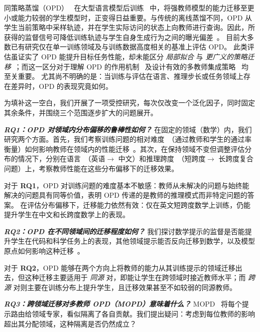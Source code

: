 同策略蒸馏（OPD）~\citep{agarwal2024policy} 在大型语言模型后训练~\cite{coreteam2026mimov2flashtechnicalreport,kimiteam2026kimik3openfrontier,glm5team2026glm5vibecodingagentic} 中，将强教师模型的能力迁移至更小或能力较弱的学生模型时，正变得日益重要。与传统的离线蒸馏不同，OPD 从学生当前策略中采样轨迹，并在学生实际访问的状态上向教师进行查询。因此，所获得的监督信号可降低训练轨迹与学生自身生成行为之间的曝光偏差~\citep{lu2025onpolicydistillation}。  
目前大多数已有研究仅在单一训练领域及与训练数据高度相关的基准上评估 OPD。  
此类评估虽证实了 OPD 能提升目标任务性能，却未能区分 \emph{局部拟合} 与 \emph{更广义的策略迁移}~\citep{chu2025sft}；而这一区分对于理解 OPD 的作用机制~\citep{li2026rethinking} 及设计有效的多教师集成策略~\citep{ma2026mopd} 均至关重要。  
尤其尚不明确的是：当训练与评估在语言、推理步长或任务领域上存在差异时，OPD 的表现究竟如何。

为填补这一空白，我们开展了一项受控研究，每次仅改变一个泛化因子，同时固定其余条件，并围绕三个范围逐步扩大的问题展开。

\textbf{\emph{RQ1：OPD 对领域内分布偏移的鲁棒性如何？}}  
在固定的领域（数学）内，我们研究两个方面。首先，我们考察训练问题的相对难度~\citep{chandra2025shape,yu2026dapo,zheng2026scope}（通过教师和学生的通过率衡量）如何影响教师在领域内的性能迁移~\citep{zheng2026scope,hou2026uni}。其次，在保持领域不变但调整评估分布的情况下，分别在语言~\citep{liu2025livemathbench,sun2026olymmath}（英语$\rightarrow$ 中文）和推理跨度~\citep{lu2025r,shojaee2025the}（短跨度$\rightarrow$ 长跨度复合问题）上，考察教师性能在这些分布偏移下的迁移效果。

对于 \textbf{RQ1}，OPD 对训练问题的难度基本不敏感：教师从未解决的问题与始终能解决的问题具有同等价值，表明 OPD 传递的是教师的推理模式而非特定问题的答案。  
在评估分布偏移下，迁移能力依然有效：仅在英文短跨度数学上训练，仍能提升学生在中文和长跨度数学上的表现。

\textbf{\emph{RQ2：OPD 在不同领域间的迁移程度如何？}}  
我们探讨数学提示的监督是否能提升学生在代码和科学任务上的表现，其他领域提示能否反向迁移到数学，以及模型原点如何影响这种迁移~\citep{luo2026demystifying}。

对于 \textbf{RQ2}，OPD 能够在两个方向上将教师的能力从其训练提示的领域迁移出去，但这种迁移主要适用于 \emph{同源} 对，即能让学生在跨领域时接近教师水平；而 \emph{跨源} 对则主要在训练分布上提升学生，且迁移效果甚至不如较弱的同源教师。

\textbf{\emph{RQ3：跨领域迁移对多教师 OPD（MOPD）意味着什么？}}  
MOPD~\citep{ma2026mopd} 将每个提示路由给领域专家，看似隔离了各自贡献。我们提出疑问：考虑到每位教师的影响超出其分配领域，这种隔离是否仍然成立？

